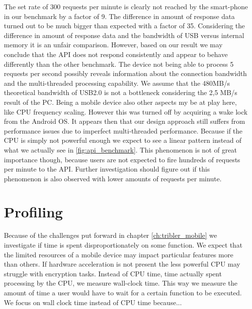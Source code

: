 The set rate of 300 requests per minute is clearly not reached by the smart-phone in our benchmark by a factor of 9.
The difference in amount of response data turned out to be much bigger than expected with a factor of 35.
Considering the difference in amount of response data and the bandwidth of USB versus internal memory it is an unfair comparison.
However, based on our result we may conclude that the API does not respond consistently and appear to behave differently than the other benchmark.
The device not being able to process 5 requests per second possibly reveals information about the connection bandwidth and the multi-threaded processing capability.
We assume that the 480MB/s theoretical bandwidth of USB2.0 is not a bottleneck considering the 2,5 MB/s result of the PC.
Being a mobile device also other aspects my be at play here, like CPU frequency scaling.
However this was turned off by acquiring a wake lock from the Android OS.
It appears then that our design approach still suffers from performance issues due to imperfect multi-threaded performance.
Because if the CPU is simply not powerful enough we expect to see a linear pattern instead of what we actually see in \ref{fig:api_benchmark}.
This phenomenon is not of great importance though, because users are not expected to fire hundreds of requests per minute to the API.
Further investigation should figure out if this phenomenon is also observed with lower amounts of requests per minute.


\section{Profiling}
Because of the challenges put forward in chapter \ref{ch:tribler_mobile} we investigate if time is spent disproportionately on some function.
We expect that the limited resources of a mobile device may impact particular features more than others.
If hardware acceleration is not present the less powerful CPU may struggle with encryption tasks.
Instead of CPU time, time actually spent processing by the CPU, we measure wall-clock time.
This way we measure the amount of time a user would have to wait for a certain function to be executed.
We focus on wall clock time instead of CPU time because...

